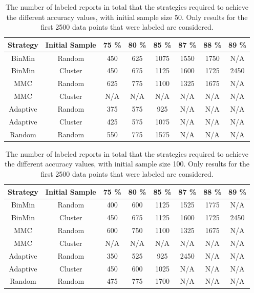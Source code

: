 \begin{table}
    \centering
    \begin{tabular}{|cccccccc|}
        \hline
        \textbf{Strategy} & \textbf{Initial Sample} & \textbf{75 \%} & \textbf{80 \%} & \textbf{85 \%} & \textbf{87 \%} & \textbf{88 \%} & \textbf{89 \%}\\
        \hline
        BinMin & Random & 450 & 625 & 1075 & 1550 & 1750 & N/A\\
        BinMin & Cluster & 450 & 675 & 1125 & 1600 & 1725 & 2450\\
        MMC & Random & 625 & 775 & 1100 & 1325 & 1675 & N/A\\
        MMC & Cluster & N/A & N/A & N/A & N/A & N/A & N/A\\
        Adaptive & Random & 375 & 575 & 925 & N/A & N/A & N/A\\
        Adaptive & Cluster & 425 & 575 & 1075 & N/A & N/A & N/A\\
        Random & Random & 550 & 775 & 1575 & N/A & N/A & N/A\\
        \hline
    \end{tabular}
    \caption{The number of labeled reports in total that the strategies required to achieve the different accuracy values, with initial sample size 50. Only results for the first 2500 data points that were labeled are considered.}
    \label{tab:active-learning-accuracy-50}
\end{table}

\begin{table}
    \centering
    \begin{tabular}{|cccccccc|}
        \hline
        \textbf{Strategy} & \textbf{Initial Sample} & \textbf{75 \%} & \textbf{80 \%} & \textbf{85 \%} & \textbf{87 \%} & \textbf{88 \%} & \textbf{89 \%}\\
        \hline
        BinMin & Random & 400 & 600 & 1125 & 1525 & 1775 & N/A\\
        BinMin & Cluster & 450 & 675 & 1125 & 1600 & 1725 & 2450\\
        MMC & Random & 600 & 750 & 1100 & 1325 & 1675 & N/A\\
        MMC & Cluster & N/A & N/A & N/A & N/A & N/A & N/A\\
        Adaptive & Random & 350 & 525 & 925 & 2450 & N/A & N/A\\
        Adaptive & Cluster & 450 & 600 & 1025 & N/A & N/A & N/A\\
        Random & Random & 475 & 775 & 1700 & N/A & N/A & N/A\\
        \hline
    \end{tabular}
    \caption{The number of labeled reports in total that the strategies required to achieve the different accuracy values, with initial sample size 100. Only results for the first 2500 data points that were labeled are considered.}
    \label{tab:active-learning-accuracy-100}
\end{table}

